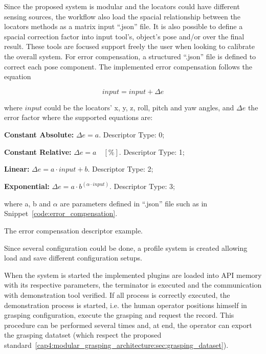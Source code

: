 Since the proposed system is modular and the locators could have different sensing sources, the workflow also load the spacial relationship between the locators methods as a matrix input ``.json'' file. It is also possible to define a spacial correction factor into input tool's, object's pose and/or over the final result. These tools are focused support freely the user when looking to calibrate the overall system. For error compensation, a structured ``.json'' file is defined to correct each pose component. The implemented error compensation follows the equation 

\begin{equation}
	input = input + \Delta e
\end{equation} 

\noindent where $input$ could be the locators' x, y, z, roll, pitch and yaw angles, and $\Delta e$ the error factor where the supported equations are:

\begin{itemize_jp}
	\item \textbf{Constant Absolute:} $\Delta e = a$. Descriptor Type: 0;
	\item \textbf{Constant Relative:} $\Delta e = a\quad[\%]$. Descriptor Type: 1;
	\item \textbf{Linear:} $\Delta e = a \cdot input + b$. Descriptor Type: 2;
	\item \textbf{Exponential:} $\Delta e = a \cdot b ^{(\alpha \cdot input)}$. Descriptor Type: 3; 
\end{itemize_jp} 

where a, b and $\alpha$ are parameters defined in ``.json'' file such as in Snippet~\ref{code:error_compensation}.

\begin{snippet}[h!]
	\centering
	\caption{The error compensation descriptor example.}
	\label{code:error_compensation}
\end{snippet}

Since several configuration could be done, a profile system is created allowing load and save different configuration setups.

When the system is started the implemented plugins are loaded into API memory with its respective parameters, the terminator is executed and the communication with demonstration tool verified. If all process is correctly executed, the demonstration process is started, i.e. the human operator positions himself in grasping configuration, execute the grasping and request the record. This procedure can be performed several times and, at end, the operator can export the grasping datatset (which respect the proposed standard~\ref{cap4:modular_grasping_architecture:sec:grasping_dataset}).

